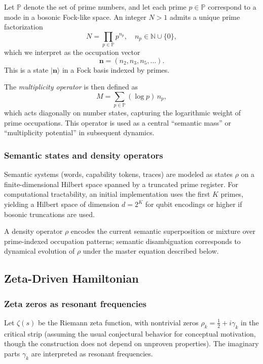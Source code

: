 \documentclass[11pt]{article}
\begin{document}
Let \(\mathbb{P}\) denote the set of prime numbers, and let each prime \(p \in \mathbb{P}\) correspond to a mode in a bosonic Fock-like space. An integer \(N > 1\) admits a unique prime factorization
\[
N = \prod_{p \in \mathbb{P}} p^{n_p}, \quad n_p \in \mathbb{N} \cup \{0\},
\]
which we interpret as the occupation vector
\[
\bm{n} = (n_2, n_3, n_5, \dots).
\]
This is a state \(|\bm{n}\rangle\) in a Fock basis indexed by primes.

The \emph{multiplicity operator} is then defined as
\begin{equation}
  M = \sum_{p \in \mathbb{P}} (\log p)\, n_p,
\end{equation}
which acts diagonally on number states, capturing the logarithmic weight of prime occupations. This operator is used as a central ``semantic mass'' or ``multiplicity potential'' in subsequent dynamics.

\subsubsection{Semantic states and density operators}

Semantic systems (words, capability tokens, traces) are modeled as states \(\rho\) on a finite-dimensional Hilbert space spanned by a truncated prime register. For computational tractability, an initial implementation uses the first \(K\) primes, yielding a Hilbert space of dimension \(d = 2^K\) for qubit encodings or higher if bosonic truncations are used.

A density operator \(\rho\) encodes the current semantic superposition or mixture over prime-indexed occupation patterns; semantic disambiguation corresponds to dynamical evolution of \(\rho\) under the master equation described below.

\subsection{Zeta-Driven Hamiltonian}

\subsubsection{Zeta zeros as resonant frequencies}

Let \(\zeta(s)\) be the Riemann zeta function, with nontrivial zeros \(\rho_k = \frac{1}{2} + i \gamma_k\) in the critical strip (assuming the usual conjectural behavior for conceptual motivation, though the construction does not depend on unproven properties). The imaginary parts \(\gamma_k\) are interpreted as resonant frequencies.
\end{document}

